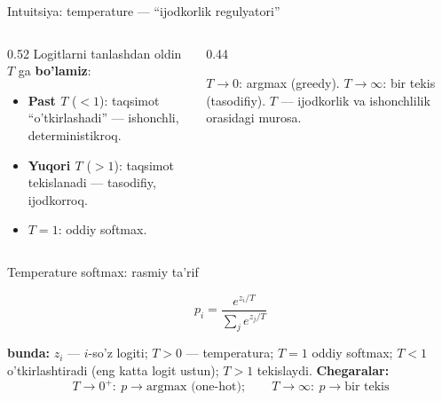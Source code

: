 \documentclass[aspectratio=169,11pt]{beamer}
\newcommand{\bunda}[1]{{\small\textbf{bunda:}\; #1}}
\begin{document}
\begin{frame}{Intuitsiya: temperature --- ``ijodkorlik regulyatori''}
  \begin{columns}[T]
    \begin{column}{0.52\textwidth}
      \small
      Logitlarni tanlashdan oldin $T$ ga \textbf{bo'lamiz}:
      \begin{itemize}\setlength\itemsep{1pt}
        \item \textbf{Past $T$} ($<1$): taqsimot ``o'tkirlashadi'' --- ishonchli,
              deterministikroq.
        \item \textbf{Yuqori $T$} ($>1$): taqsimot tekislanadi --- tasodifiy,
              ijodkorroq.
        \item $T{=}1$: oddiy softmax.
      \end{itemize}
    \end{column}
    \begin{column}{0.44\textwidth}
      \begin{tcolorbox}[okbox,top=2pt,bottom=2pt]
        \footnotesize
        $T\to 0$: argmax (greedy). $T\to\infty$: bir tekis (tasodifiy). $T$ ---
        ijodkorlik va ishonchlilik orasidagi murosa.
      \end{tcolorbox}
    \end{column}
  \end{columns}
\end{frame}

\begin{frame}{Temperature softmax: rasmiy ta'rif}
  \begin{tcolorbox}[defbox,title=Ta'rif: temperature bilan softmax]
    \vspace{-0.4em}
    $$ p_i = \frac{e^{z_i / T}}{\sum_{j} e^{z_j / T}} $$
  \end{tcolorbox}
  \vspace{3pt}
  \bunda{$z_i$ --- $i$-so'z logiti; $T>0$ --- temperatura; $T{=}1$ oddiy softmax;
  $T<1$ o'tkirlashtiradi (eng katta logit ustun); $T>1$ tekislaydi.}
  \vspace{4pt}
  \textbf{Chegaralar:}
  $$ T\to 0^{+}:\ p\to \text{argmax (one-hot)}; \qquad T\to\infty:\ p\to \text{bir tekis} $$
\end{frame}
\end{document}
